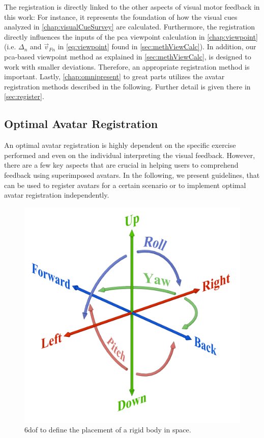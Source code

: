 The registration is directly linked to the other aspects of visual motor feedback in this work: For instance, it represents the foundation of how the visual cues analyzed in \autoref{chap:visualCueSurvey} are calculated.
Furthermore, the registration directly influences the inputs of the \acrfull{pca} viewpoint calculation in \autoref{chap:viewpoint} (i.e. $\Delta_n$ and  $\vec{v}_{Fn}$ in \autoref{eq:viewpoint} found in \autoref{sec:methViewCalc}). In addition, our \acrshort{pca}-based viewpoint method as explained in \autoref{sec:methViewCalc}, is designed to work with smaller deviations. Therefore, an appropriate registration method is important. Lastly, \autoref{chap:omnipresent} to great parts utilizes the avatar registration methods described in the following. Further detail is given there in \autoref{sec:register}.

\subsection*{Optimal Avatar Registration \label{sec:optimalReg}}
An optimal avatar registration is highly dependent on the specific exercise performed and even on the individual interpreting the visual feedback. However, there are a few key aspects that are crucial in helping users to comprehend feedback using superimposed avatars. In the following, we present guidelines, that can be used to register avatars for a certain scenario or to implement optimal avatar registration independently.

\begin{figure}[t]
	\centering
	\includegraphics[width=0.5\linewidth]{pictures/Gizmos.png}
	\caption[\acrlong{6dof} to define the placement of a rigid body.]{\acrlong{6dof} to define the placement of a rigid body in space.}
	\label{fig:6dof}
\end{figure}

